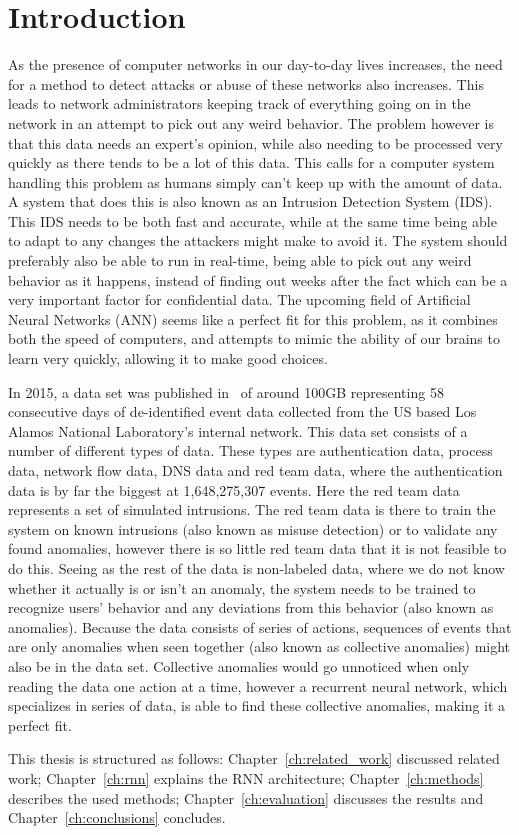 \chapter{Introduction}\label{ch:introduction}
As the presence of computer networks in our day-to-day lives increases, the need for a method to detect attacks or abuse of these networks also increases. This leads to network administrators keeping track of everything going on in the network in an attempt to pick out any weird behavior. The problem however is that this data needs an expert's opinion, while also needing to be processed very quickly as there tends to be a lot of this data. This calls for a computer system handling this problem as humans simply can't keep up with the amount of data. A system that does this is also known as an Intrusion Detection System (IDS). This IDS needs to be both fast and accurate, while at the same time being able to adapt to any changes the attackers might make to avoid it. The system should preferably also be able to run in real-time, being able to pick out any weird behavior as it happens, instead of finding out weeks after the fact which can be a very important factor for confidential data. The upcoming field of Artificial Neural Networks (ANN) seems like a perfect fit for this problem, as it combines both the speed of computers, and attempts to mimic the ability of our brains to learn very quickly, allowing it to make good choices.

In 2015, a data set was published in~\cite{akent-2015-enterprise-data} of around 100GB representing 58 consecutive days of de-identified event data collected from the US based Los Alamos National Laboratory's internal network. This data set consists of a number of different types of data. These types are authentication data, process data, network flow data, DNS data and red team data, where the authentication data is by far the biggest at 1,648,275,307 events. Here the red team data represents a set of simulated intrusions. The red team data is there to train the system on known intrusions (also known as misuse detection) or to validate any found anomalies, however there is so little red team data that it is not feasible to do this. Seeing as the rest of the data is non-labeled data, where we do not know whether it actually is or isn't an anomaly, the system needs to be trained to recognize users' behavior and any deviations from this behavior (also known as anomalies). Because the data consists of series of actions, sequences of events that are only anomalies when seen together (also known as collective anomalies) might also be in the data set. Collective anomalies would go unnoticed when only reading the data one action at a time, however a recurrent neural network, which specializes in series of data, is able to find these collective anomalies, making it a perfect fit.

This thesis is structured as follows: Chapter~\ref{ch:related_work} discussed related work; Chapter~\ref{ch:rnn} explains the RNN architecture; Chapter~\ref{ch:methods} describes the used methods; Chapter~\ref{ch:evaluation} discusses the results and Chapter~\ref{ch:conclusions} concludes.